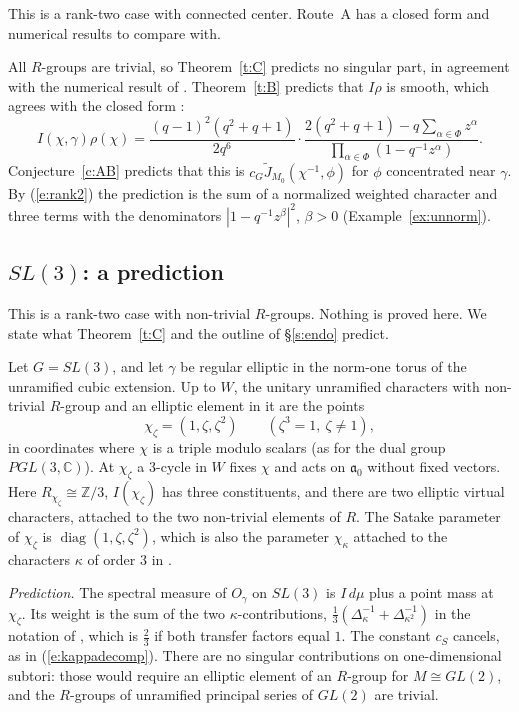 \documentclass[12pt,letterpaper]{article}
\numberwithin{equation}{section}
\theoremstyle{plain}
\theoremstyle{definition}
\theoremstyle{remark}
\newcommand{\fa}{\mathfrak{a}}
\DeclareMathOperator{\diag}{diag}
\begin{document}
This is a rank-two case with connected center. Route~A has a closed form and numerical results to compare with.

All $R$-groups are trivial, so Theorem~\ref{t:C} predicts no singular part, in agreement with the numerical result of \cite[App.~A]{JC26}. Theorem~\ref{t:B} predicts that $I\rho$ is smooth, which agrees with the closed form \cite[(A.4)]{JC26}:
\[
I(\chi,\gamma)\rho(\chi)=\frac{(q-1)^2(q^2+q+1)}{2q^6}\cdot\frac{2(q^2+q+1)-q\sum_{\alpha\in\Phi}z^\alpha}{\prod_{\alpha\in\Phi}(1-q^{-1}z^\alpha)}.
\]
Conjecture~\ref{c:AB} predicts that this is $c_G\widetilde J_{M_0}(\chi^{-1},\phi)$ for $\phi$ concentrated near $\gamma$. By (\ref{e:rank2}) the prediction is the sum of a normalized weighted character and three terms with the denominators $|1-q^{-1}z^\beta|^2$, $\beta>0$ (Example~\ref{ex:unnorm}).

\subsection{\texorpdfstring{$SL(3)$}{SL(3)}: a prediction}\label{s:sl3}

This is a rank-two case with non-trivial $R$-groups. Nothing is proved here. We state what Theorem~\ref{t:C} and the outline of \S\ref{s:endo} predict.

Let $G=SL(3)$, and let $\gamma$ be regular elliptic in the norm-one torus of the unramified cubic extension. Up to $W$, the unitary unramified characters with non-trivial $R$-group and an elliptic element in it are the points
\[
\chi_\zeta=(1,\zeta,\zeta^2)\qquad(\zeta^3=1,\ \zeta\ne1),
\]
in coordinates where $\chi$ is a triple modulo scalars (as for the dual group $PGL(3,\mathbb{C})$). At $\chi_\zeta$ a $3$-cycle in $W$ fixes $\chi$ and acts on $\fa_0$ without fixed vectors. Here $R_{\chi_\zeta}\cong\mathbb{Z}/3$, $I(\chi_\zeta)$ has three constituents, and there are two elliptic virtual characters, attached to the two non-trivial elements of $R$. The Satake parameter of $\chi_\zeta$ is $\diag(1,\zeta,\zeta^2)$, which is also the parameter $\chi_\kappa$ attached to the characters $\kappa$ of order $3$ in \cite[Prop.~5.1]{JC26}.

\emph{Prediction.} The spectral measure of $O_\gamma$ on $SL(3)$ is $I\,d\mu$ plus a point mass at $\chi_\zeta$. Its weight is the sum of the two $\kappa$-contributions, $\frac13(\Delta_\kappa^{-1}+\Delta_{\kappa^2}^{-1})$ in the notation of \cite[(5.4A), Prop.~5.1]{JC26}, which is $\frac23$ if both transfer factors equal $1$. The constant $c_S$ cancels, as in (\ref{e:kappadecomp}). There are no singular contributions on one-dimensional subtori: those would require an elliptic element of an $R$-group for $M\cong GL(2)$, and the $R$-groups of unramified principal series of $GL(2)$ are trivial.
\end{document}
